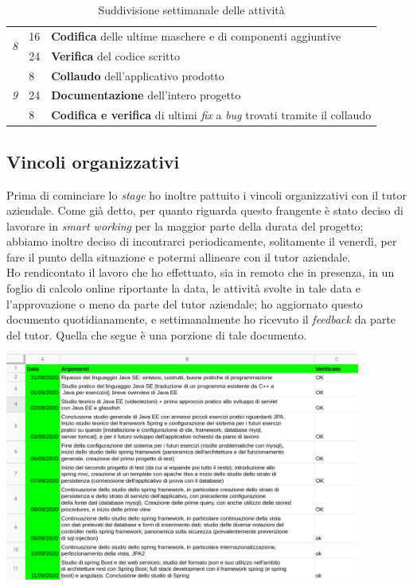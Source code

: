 \begin{table}[h]
\begin{tabularx}{\textwidth}{|l|l|X|}
  \multirow{2}{*}{\textit{8}} & 16           & \textbf{Codifica} delle ultime maschere e di componenti aggiuntive           \\ \cline{2-3}
                              & 24           & \textbf{Verifica} del codice scritto                  \\ \hline
  \multirow{3}{*}{\textit{9}} & 8            & \textbf{Collaudo} dell'applicativo prodotto                  \\ \cline{2-3}
                              & 24           & \textbf{Documentazione} dell'intero progetto            \\ \cline{2-3}
                              & 8            & \textbf{Codifica e verifica} di ultimi \textit{fix} a \textit{bug} trovati tramite il collaudo                \\ \hline
  \end{tabularx}
  \caption{Suddivisione settimanale delle attività}
\end{table}

\subsection{Vincoli organizzativi}

Prima di cominciare lo \textit{stage} ho inoltre pattuito i vincoli organizzativi con il tutor aziendale. Come già detto, per quanto riguarda questo frangente è stato deciso di lavorare in \textit{smart working} per la maggior parte della durata del progetto; abbiamo inoltre deciso di incontrarci periodicamente, solitamente il venerdì, per fare il punto della situazione e potermi allineare con il tutor aziendale. \\
Ho rendicontato il lavoro che ho effettuato, sia in remoto che in presenza, in un foglio di calcolo online riportante la data, le attività svolte in tale data e l'approvazione o meno da parte del tutor aziendale; ho aggiornato questo documento quotidianamente, e settimanalmente ho ricevuto il \textit{feedback} da parte del tutor. Quella che segue è una porzione di tale documento. \\

\begin{minipage}{\linewidth}
  \centering
    \includegraphics[height=7.5cm]{immagini/drive}
\end{minipage} \\

